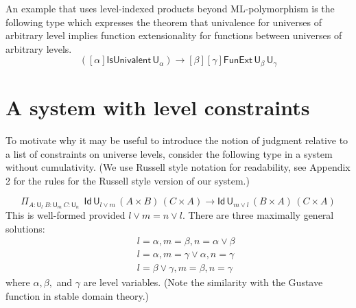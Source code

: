 \documentclass[11pt,a4paper]{article}
\theoremstyle{definition}
\newcommand{\Id}{\mathsf{Id}}
\newcommand{\NN}{\mathsf{N}}
\newcommand{\UU}{\mathsf{U}}
\begin{document}
An example that uses level-indexed products beyond ML-polymorphism
is the following type which
expresses the theorem that univalence for universes of arbitrary level implies
function extensionality for functions between universes of arbitrary levels.
$$
([\alpha]\mathsf{IsUnivalent}\, \UU_\alpha)
\to [\beta][\gamma] \mathsf{FunExt}\, \UU_\beta\, \UU_\gamma
$$



\section{A system with level constraints}\label{sec:constraints}

To motivate why it may be useful to introduce the notion of judgment relative to a list of constraints on universe levels, consider the following type in a system without cumulativity. (We use Russell style notation for readability, see Appendix 2 for the rules for the Russell style version of our system.)

$$
    \Pi_{A:\UU_l~{B}:{\UU_m}~{C}:{\UU_n}}
    {~~\Id\,\UU_{l \vee m}\, (A\times B)\,(C \times A)
    \to \Id\,\UU_{m \vee l} \, (B\times A)\,(C \times A)}
$$
This is well-formed provided $l \vee m = n \vee l$. 
There are three maximally general solutions:
\begin{eqnarray*}
&&l = \alpha, m = \beta, n = \alpha \vee \beta\\
&&l = \alpha, m = \gamma \vee \alpha, n = \gamma\\
&&l = \beta \vee \gamma, m = \beta, n = \gamma
\end{eqnarray*}
where $\alpha, \beta,$ and $\gamma$ are level
variables. (Note the similarity with the Gustave function 
in stable domain theory.) 
\end{document}
